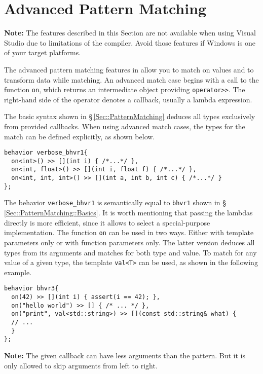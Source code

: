 \section{Advanced Pattern Matching}
\label{Sec::AdvancedPatternMatching}

\textbf{Note:} The features described in this Section are not available when using Visual Studio due to limitations of the compiler.
Avoid those features if Windows is one of your target platforms.

The advanced pattern matching features in \lib allow you to match on values and to transform data while matching.
An advanced match case begins with a call to the function \lstinline^on^, which returns an intermediate object providing \lstinline^operator>>^.
The right-hand side of the operator denotes a callback, usually a lambda expression.

The basic syntax shown in \S\,\ref{Sec::PatternMatching} deduces all types exclusively from provided callbacks.
When using advanced match cases, the types for the match can be defined explicitly, as shown below.

\begin{lstlisting}
behavior verbose_bhvr1{
  on<int>() >> [](int i) { /*...*/ },
  on<int, float>() >> [](int i, float f) { /*...*/ },
  on<int, int, int>() >> [](int a, int b, int c) { /*...*/ }
};
\end{lstlisting}

The behavior \lstinline^verbose_bhvr1^ is semantically equal to \lstinline^bhvr1^ shown in \S\,\ref{Sec::PatternMatching::Basics}.
It is worth mentioning that passing the lambdas directly is more efficient, since it allows \lib to select a special-purpose implementation.
The function \lstinline^on^ can be used in two ways.
Either with template parameters only or with function parameters only.
The latter version deduces all types from its arguments and matches for both type and value.
To match for any value of a given type, the template \lstinline^val<T>^ can be used, as shown in the following example.

\begin{lstlisting}
behavior bhvr3{
  on(42) >> [](int i) { assert(i == 42); },
  on("hello world") >> [] { /* ... */ },
  on("print", val<std::string>) >> [](const std::string& what) {
  // ...
  }
};
\end{lstlisting}

\textbf{Note:} The given callback can have less arguments than the pattern.
But it is only allowed to skip arguments from left to right.

